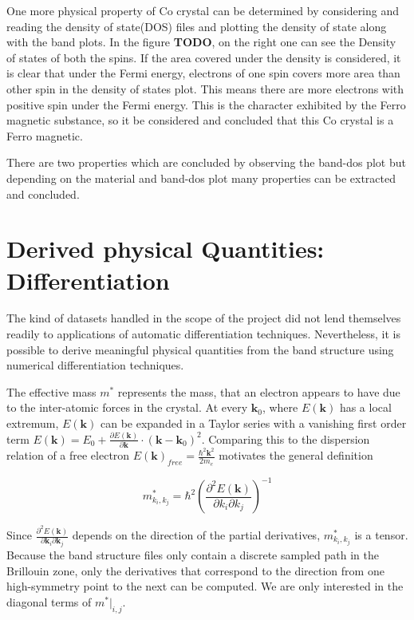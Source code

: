 One more physical property of Co crystal can be determined by considering and reading the density of state(DOS) files and plotting the density of state along with the band plots. In the figure \textbf{TODO}, on the right one can see the Density of states of both the spins. If the area covered under the density is considered, it is clear that under the Fermi energy, electrons of one spin covers more area than other spin in the density of states plot. This means there are more electrons with positive spin under the Fermi energy. This is the character exhibited by the Ferro magnetic substance, so it be considered and concluded that this Co crystal is a Ferro magnetic.

There are two properties which are concluded by observing the band-dos plot but depending on the material and band-dos plot many properties can be extracted and concluded.


\section{Derived physical Quantities: Differentiation}



The kind of datasets handled in the scope of the project did not lend themselves
readily to applications of automatic differentiation techniques. Nevertheless,
it is possible to derive meaningful physical quantities from the band structure
using numerical differentiation techniques.

The effective mass $m^{*}$ represents the mass, that an electron appears to have due to the inter-atomic forces in the crystal. At every $\mathbf{k}_0$, where $E(\mathbf{k})$ has a local extremum, $E(\mathbf{k})$ can be expanded in a Taylor series with a vanishing first order term $E(\mathbf{k}) = E_0 + \frac{\partial E(\mathbf{k})}{\partial \mathbf{k}} \cdot (\mathbf{k}-\mathbf{k}_0)^2$. Comparing this to the dispersion relation of a free electron $E(\mathbf{k})_{free} = \frac{\hbar^2 \mathbf{k}^2}{2 m_e}$ motivates the general definition 

\begin{equation}
    m^{*}_{k_i,k_j} = \hbar^2  \left(\frac{\partial^2E(\mathbf{k})}{\partial k_i \partial k_j}\right)^{-1}
\end{equation}

Since $\frac{\partial^2E(\mathbf{k})}{\partial \mathbf{k}_i \partial \mathbf{k}_j}$ depends on the direction of the partial derivatives, $m^{*}_{k_i,k_j}$ is a tensor. Because the band structure files only contain a discrete sampled path in the Brillouin zone, only the derivatives that correspond to the direction from one high-symmetry point to the next can be computed. We are only interested in the diagonal terms of $m^{*}\big|_{i,j}$.

